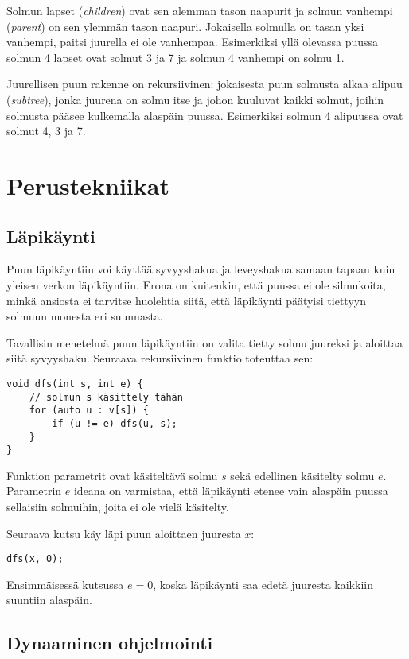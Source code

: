 Solmun lapset (\textit{children})
ovat sen alemman tason naapurit
ja solmun vanhempi (\textit{parent})
on sen ylemmän tason naapuri.
Jokaisella solmulla on tasan yksi vanhempi,
paitsi juurella ei ole vanhempaa.
Esimerkiksi yllä olevassa puussa solmun 4
lapset ovat solmut 3 ja 7 ja solmun 4 vanhempi on solmu 1.

Juurellisen puun rakenne on rekursiivinen:
jokaisesta puun solmusta alkaa alipuu (\textit{subtree}),
jonka juurena on solmu itse ja johon kuuluvat
kaikki solmut, joihin solmusta pääsee kulkemalla alaspäin puussa.
Esimerkiksi solmun 4 alipuussa
ovat solmut 4, 3 ja 7.

\section{Perustekniikat}

\subsection{Läpikäynti}

Puun läpikäyntiin voi käyttää syvyyshakua ja
leveyshakua samaan
tapaan kuin yleisen verkon läpikäyntiin.
Erona on kuitenkin, että puussa ei ole silmukoita,
minkä ansiosta ei tarvitse huolehtia siitä,
että läpikäynti päätyisi tiettyyn
solmuun monesta eri suunnasta.

Tavallisin menetelmä puun läpikäyntiin on
valita tietty solmu juureksi ja aloittaa
siitä syvyyshaku.
Seuraava rekursiivinen funktio toteuttaa sen:

\begin{lstlisting}
void dfs(int s, int e) {
    // solmun s käsittely tähän
    for (auto u : v[s]) {
        if (u != e) dfs(u, s);
    }
}
\end{lstlisting}

Funktion parametrit ovat käsiteltävä solmu $s$
sekä edellinen käsitelty solmu $e$.
Parametrin $e$ ideana on varmistaa, että
läpikäynti etenee vain alaspäin puussa
sellaisiin solmuihin, joita ei ole vielä käsitelty.

Seuraava kutsu käy läpi puun aloittaen juuresta $x$:

\begin{lstlisting}
dfs(x, 0);
\end{lstlisting}

Ensimmäisessä kutsussa $e=0$, koska läpikäynti
saa edetä juuresta kaikkiin suuntiin alaspäin.

\subsection{Dynaaminen ohjelmointi}

